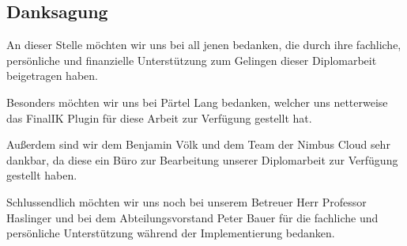 \begin{spacing}{1}

    \chapter*{Danksagung}

\end{spacing}

An dieser Stelle möchten wir uns bei all jenen bedanken, die durch ihre fachliche, persönliche und finanzielle Unterstützung zum Gelingen dieser Diplomarbeit beigetragen haben.

Besonders möchten wir uns bei Pärtel Lang bedanken, welcher uns netterweise das FinalIK Plugin für diese Arbeit zur Verfügung gestellt hat.

Außerdem sind wir dem Benjamin Völk und dem Team der Nimbus Cloud sehr dankbar, da diese ein Büro zur Bearbeitung unserer Diplomarbeit zur Verfügung gestellt haben.

Schlussendlich möchten wir uns noch bei unserem Betreuer Herr Professor Haslinger und bei dem Abteilungsvorstand Peter Bauer für die fachliche und persönliche Unterstützung während der Implementierung bedanken.
